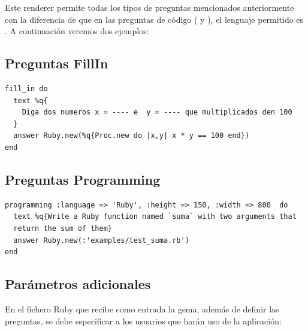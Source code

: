 Este renderer permite todas los tipos de preguntas mencionados anteriormente con la diferencia de que en las preguntas de c\'odigo ( y ), 
el lenguaje permitido es . A continuaci\'on veremos dos ejemplos:

\subsection{Preguntas FillIn}
\label{subsec:Apendice2.11}

\begin{lstlisting}
fill_in do
  text %q{
    Diga dos numeros x = ---- e  y = ---- que multiplicados den 100
  }
  answer Ruby.new(%q{Proc.new do |x,y| x * y == 100 end})
end
\end{lstlisting}

\subsection{Preguntas Programming}
\label{subsec:Apendice2.11}

\begin{lstlisting}
programming :language => 'Ruby', :height => 150, :width => 800  do
  text %q{Write a Ruby function named `suma` with two arguments that 
  return the sum of them}
  answer Ruby.new(:'examples/test_suma.rb')
end
\end{lstlisting}

\subsection{Par\'ametros adicionales}
\label{subsec:Apendice2.12}

En el fichero Ruby que recibe como entrada la gema, adem\'as de definir las preguntas, se debe especificar a los usuarios que har\'an
uso de la aplicaci\'on:

